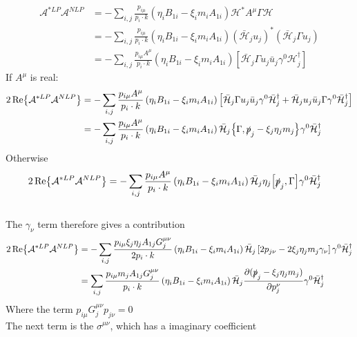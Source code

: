\documentclass{article}
\newcommand{\s}[1]{\slashed #1}
\begin{document}
\begin{align*}
	\mathcal{A}^{*LP}\mathcal{A}^{NLP} &= -\sum_{i,j}\frac{p_{i\mu}}{p_i\cdot k}\left(\eta_iB_{1i}-\xi_im_iA_{1i}\right)\mathcal{H}^*A^\mu\Gamma\mathcal{H}\\&
	=-\sum_{i,j}\frac{p_{i\mu}}{p_i\cdot k}\left(\eta_iB_{1i}-\xi_im_iA_{1i}\right)(\bar{\mathcal{H}}_ju_j)^*(\bar{\mathcal{H}}_j\Gamma u_j)\\&
	=-\sum_{i,j}\frac{p_{i\mu}A^{\mu}}{p_i\cdot k}\left(\eta_iB_{1i}-\xi_im_iA_{1i}\right)\left[\bar{\mathcal{H}}_j\Gamma u_j\bar{u}_j\gamma^0\mathcal{H}^\dag_j\right]
\end{align*}
If $A^\mu$ is real:
\begin{align*}
	2\Re{\mathcal{A}^{*LP}\mathcal{A}^{NLP}} &=-\sum_{i,j}\frac{p_{i\mu}A^{\mu}}{p_i\cdot k}\left(\eta_iB_{1i}-\xi_im_iA_{1i}\right)\left[\bar{\mathcal{H}}_j\Gamma u_j\bar{u}_j\gamma^0\bar{\mathcal{H}}^\dag_j+\bar{\mathcal{H}}_ju_j\bar{u}_j \Gamma\gamma^0\bar{\mathcal{H}}^\dag_j\right]\\&
	=-\sum_{i,j}\frac{p_{i\mu}A^{\mu}}{p_i\cdot k}\left(\eta_iB_{1i}-\xi_im_iA_{1i}\right)\bar{\mathcal{H}}_j\acomm{\Gamma}{\s{p}_j-\xi_j\eta_j m_j}\gamma^0\bar{\mathcal{H}}^\dag_j
\end{align*}
Otherwise
\begin{align*}
	2\Re{\mathcal{A}^{*LP}\mathcal{A}^{NLP}} &=-\sum_{i,j}\frac{p_{i\mu}A^{\mu}}{p_i\cdot k}\left(\eta_iB_{1i}-\xi_im_iA_{1i}\right)\bar{\mathcal{H}}_j\eta_j\comm{\s{p}_j}{\Gamma}\gamma^0\bar{\mathcal{H}}^\dag_j
\end{align*}
\\
The $\gamma_\nu$ term therefore gives a contribution
\begin{align*}
	2\Re{\mathcal{A}^{*LP}\mathcal{A}^{NLP}} &=-\sum_{i,j}\frac{p_{i\mu}\xi_j\eta_j A_{1j}G_j^{\mu\nu}}{2p_i\cdot k}\left(\eta_iB_{1i}-\xi_im_iA_{1i}\right)\bar{\mathcal{H}}_j\left[2p_{j\nu}-2\xi_j\eta_jm_j\gamma_\nu\right]\gamma^0\bar{\mathcal{H}}^\dag_j\\&
	=\sum_{i,j}\frac{p_{i\mu} m_jA_{1j}G_j^{\mu\nu}}{p_i\cdot k}\left(\eta_iB_{1i}-\xi_im_iA_{1i}\right)\bar{\mathcal{H}}_j\pdv{(\s{p}_j-\xi_j\eta_j m_j)}{p_j^\nu}\gamma^0\bar{\mathcal{H}}^\dag_j
\end{align*}
Where the term $p_{i\mu}G^{\mu\nu}_j p_{j\nu} = 0$
\\
The next term is the $\sigma^{\mu\nu}$, which has a imaginary coefficient
\end{document}
